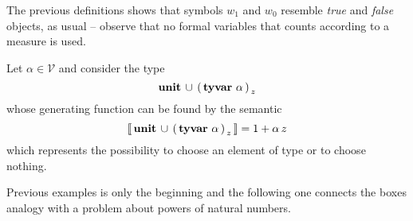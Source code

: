 The previous definitions shows that symbols $w_{1}$ and $w_{0}$ resemble
\textit{true} and \textit{false} objects, as usual -- observe that no formal
variables that counts according to a measure is used.

\begin{example}
Let $\alpha\in\mathcal{V}$ and consider the type
\begin{displaymath}
    \textbf{unit}\,\cup\,{\left(\,\textbf{tyvar}\,\,\alpha\,\right)}_{\,z}
\end{displaymath}
whose generating function can be found by the semantic
\begin{displaymath}
    \left\llbracket\,\textbf{unit}\,\cup\,{\left(\,\textbf{tyvar}\,\,\alpha\,\right)}_{\,z}\,\right\rrbracket = 1 + \alpha\,z
\end{displaymath}
which represents the possibility to choose an element of type \tyvar{\alpha} or
to choose nothing.
\end{example}

Previous examples is only the beginning and the following one connects
the boxes analogy with a problem about powers of natural numbers.

